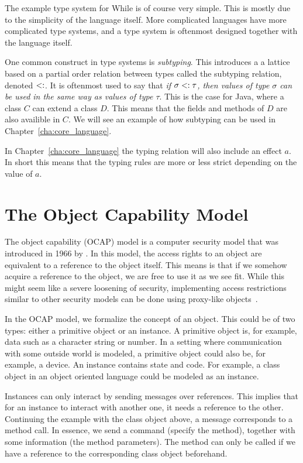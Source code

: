 The example type system for While is of course very simple. This is mostly due
to the simplicity of the language itself. More complicated languages have more
complicated type systems, and a type system is oftenmost designed together 
with the language itself. 

One common construct in type systems is \emph{subtyping}. This introduces a a
lattice based on a partial order relation between types called the subtyping
relation, denoted $<:$.  It is oftenmost used to say that \emph{if $\sigma <:
\tau$, then values of type $\sigma$ can be used in the same way as values of type
$\tau$}. This is the case for Java, where a class $C$ can extend a class $D$.
This means that the fields and methods of $D$ are also availible
in $C$. We will see an example of how subtyping can be used in
Chapter~\ref{cha:core_language}. 

In Chapter~\ref{cha:core_language} the typing relation will also include an
effect $a$. In short this means that the typing rules are more or less strict
depending on the value of $a$.

\section{The Object Capability Model}%
\label{sec:the_object_capability_model}

The object capability (OCAP) model is a computer security model that was
introduced in 1966 by \textcite{Dennis-VanHorn66}. In this model, the access
rights to an object are equivalent to a reference to the object itself. 
This means is that if we somehow acquire a reference to the object, we are free
to use it as we see fit. While this might seem like a severe loosening of
security, implementing access restrictions similar to other security models can
be done using proxy-like objects~\parencite{Miller06b}.

In the OCAP model, we formalize the concept of an object. This could be of
two types: either a primitive object or an instance. A primitive object is,
for example, data such as a character string or number. In a setting where
communication with some outside world is modeled, a primitive object could also
be, for example,
a device. An instance contains state and code. For example, a class
object in an object oriented language could be modeled as an
instance.

Instances can only interact by sending messages over references. This implies
that for an instance to interact with another one, it needs a reference to the
other. Continuing the example with the class object above, a message corresponds
to a method call. In essence, we send a command (specify the method), together
with some information (the method parameters). The method can only be called if
we have a reference to the corresponding class object beforehand.

